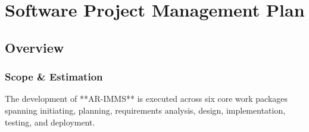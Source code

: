 \chapter{Software Project Management Plan}

\section{Overview}

\subsection{Scope \& Estimation}
The development of **AR-IMMS** is executed across six core work packages spanning initiating, planning, requirements analysis, design, implementation, testing, and deployment.

